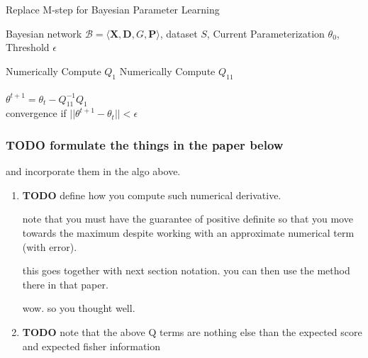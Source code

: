 \documentclass[11pt]{article}
\begin{document}
\begin{article}
\begin{algorithm*}[h!]
\caption{Replace M-step for Bayesian Parameter Learning}
\label{alg:Numerical-M-Step}
\vspace{-10pt}
\begin{multicols}{2}
\begin{algorithmic}[1] 
\Require Bayesian network $\mathcal{B}=\langle \mathbf{X},\mathbf{D}, G, \mathbf{P} \rangle$, dataset $S$, Current Parameterization $\theta_0$, Threshold $\epsilon$

   \State Numerically Compute $Q_1$
   \State Numerically Compute $Q_{11}$\\

   \\
      \State $\theta^{t+1}= \theta_{t} - Q_{11}^{-1} Q_1$\\
      \State convergence if $||\theta^{t+1} - \theta_{t}|| < \epsilon$
   \EndForAll
\end{algorithmic}
\end{multicols}
\end{algorithm*}


\subsubsection{{\bfseries\sffamily TODO} formulate the things in the paper below}
\label{sec:orgfbeff0c}

and incorporate them in the algo above.

\begin{enumerate}
\item {\bfseries\sffamily TODO} define how you compute such numerical derivative.
\label{sec:org813c598}

note that you must have the guarantee of positive definite so that
you move towards the maximum despite working with an approximate
numerical term (with error).

this goes together with next section notation. you can then use the
method there in that paper.

wow. so you thought well.


\item {\bfseries\sffamily TODO} note that the above Q terms are nothing else than the expected score and expected fisher information
\label{sec:org62aef04}


\end{enumerate}
\end{article}
\end{document}
